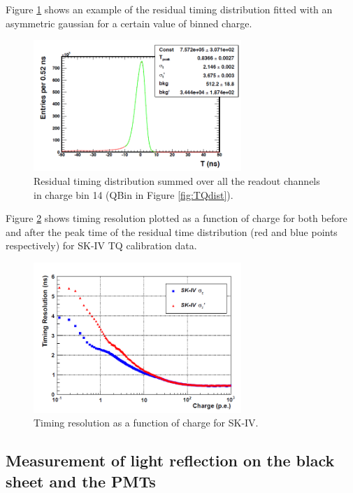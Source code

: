Figure \ref{fig:asygausst} shows an example of the residual timing distribution fitted with an asymmetric gaussian for a certain value of binned charge.

\begin{figure}
    \centering
    \includegraphics[width=0.7\textwidth]{Figures/asygausst.png}
\caption{Residual timing distribution summed over all the readout channels in charge bin 14 (QBin in Figure \ref{fig:TQdist}).}
    \label{fig:asygausst}
\end{figure}



Figure \ref{fig:resolutiont} shows timing resolution  plotted as a function of charge for both before and after the peak time of the residual time distribution (red and blue points respectively) for SK-IV TQ calibration data. 

\begin{figure}
    \centering
    \includegraphics[width=0.7\textwidth]{Figures/resolutiont.png}
\caption{Timing resolution as a function of charge for SK-IV.}
    \label{fig:resolutiont}
\end{figure}

\subsection{Measurement of light reflection on the black sheet and the PMTs} 

